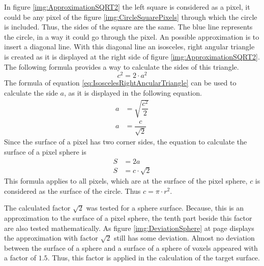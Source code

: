 In figure \ref{img:ApproximationSQRT2} the left square is considered as a pixel, it could be any pixel of the figure \ref{img:CircleSquarePixels} through which the circle is included. Thus, the sides of the square are the same. The blue line represents the circle, in a way it could go through the pixel. An possible approximation is to insert a diagonal line. With this diagonal line an isosceles, right angular triangle is created as it is displayed at the right side of figure \ref{img:ApproximationSQRT2}. \newline
The following formula provides a way to calculate the sides of this triangle.
\begin{equation}\label{eq:IsoscelesRightAncularTriangle}
c^{2} = 2 \cdot a^{2}
\end{equation}
The formula of equation \ref{eq:IsoscelesRightAncularTriangle} can be used to calculate the side $a$, as it is displayed in the following equation.
\begin{equation}\label{eq:CornerSideAOfTriangle}
\begin{split}
a &= \sqrt{\dfrac{c^{2}}{2}} \\
a &= \dfrac{c}{\sqrt{2}}
\end{split}
\end{equation}
Since the surface of a pixel has two corner sides, the equation to calculate the surface of a pixel sphere is
\begin{equation}\label{eq:PixelSurfaceCalculation}
\begin{split}
S &= 2a \\
S &= c \cdot \sqrt{2}
\end{split}
\end{equation}
This formula applies to all pixels, which are at the surface of the pixel sphere, $c$ is considered as the surface of the circle. Thus $c = \pi \cdot r^{2}$.

The calculated factor $\sqrt{2}$ was tested for a sphere surface. Because, this is an approximation to the surface of a pixel sphere, the tenth part beside this factor are also tested mathematically. As figure \ref{img:DeviationSphere} at page \pageref{img:DeviationSphere} displays the  approximation with factor $\sqrt{2}$ still has some deviation. Almost no deviation between the surface of a sphere and a surface of a sphere of voxels appeared with a factor of $1.5$. Thus, this factor is applied in the calculation of the target surface. 

